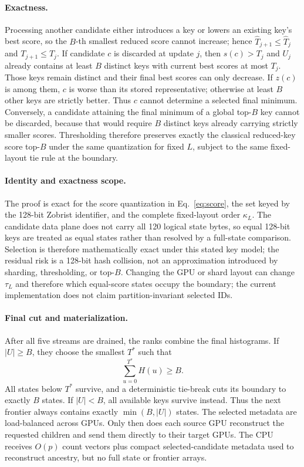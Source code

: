 \documentclass[10pt,twocolumn]{article}
\newcommand{\beam}{B}
\begin{document}
\paragraph{Exactness.}
Processing another candidate either introduces a key or lowers an existing
key's best score, so the $\beam$-th smallest reduced score cannot increase;
hence $\widehat T_{j+1}\leq\widehat T_j$ and $T_{j+1}\leq T_j$.  If candidate
$c$ is discarded at update $j$, then $s(c)>T_j$ and $U_j$ already contains at
least $\beam$ distinct keys with current best scores at most $T_j$.  Those keys
remain distinct and their final best scores can only decrease.  If $z(c)$ is
among them, $c$ is worse than its stored representative; otherwise at least
$\beam$ other keys are strictly better.  Thus $c$ cannot determine a selected
final minimum.  Conversely, a candidate attaining the final minimum of a
global top-$\beam$ key cannot be discarded, because that would require
$\beam$ distinct keys already carrying strictly smaller scores.  Thresholding
therefore preserves exactly the classical reduced-key score top-$\beam$ under
the same quantization for fixed $L$, subject to the same fixed-layout tie rule
at the boundary.

\paragraph{Identity and exactness scope.}
The proof is exact for the score quantization in Eq.~\eqref{eq:score}, the set
keyed by the 128-bit Zobrist identifier, and the complete fixed-layout order
$\kappa_L$.  The candidate data plane does not carry all 120
logical state bytes, so equal 128-bit keys are treated as equal states rather
than resolved by a full-state comparison.  Selection is therefore
mathematically exact under this stated key model; the residual risk is a
128-bit hash collision, not an approximation introduced by sharding,
thresholding, or top-$\beam$.  Changing the GPU or shard layout can change
$\tau_L$ and therefore which equal-score states occupy the boundary; the
current implementation does not claim partition-invariant selected IDs.

\paragraph{Final cut and materialization.}
After all five streams are drained, the ranks combine the final histograms.  If
$|U|\geq\beam$, they choose the smallest $T^*$ such that
\begin{equation}
 \sum_{u=0}^{T^*}H(u)\geq\beam.
 \label{eq:threshold}
\end{equation}
All states below $T^*$ survive, and a deterministic tie-break cuts its boundary
to exactly $\beam$ states.  If $|U|<\beam$, all available keys survive instead.
Thus the next frontier always contains exactly $\min(\beam,|U|)$ states.  The
selected metadata are load-balanced across GPUs.
Only then does each source GPU reconstruct the requested children and send
them directly to their target GPUs.  The CPU receives $O(p)$ count vectors plus
compact selected-candidate metadata used to reconstruct ancestry, but no full
state or frontier arrays.
\end{document}
